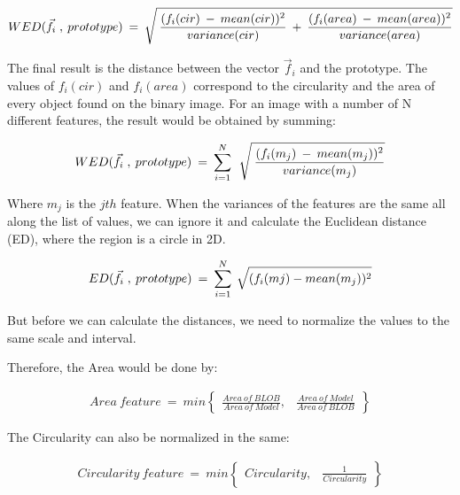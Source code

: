 \begin{equation}	
	\begin{aligned}
{WED(\vec{f}_{i} \; , \: prototype)} \: = \: \sqrt{\mathstrut \:  \displaystyle\frac{(f_{i}(cir) \: - \: mean(cir))^2}{variance(cir)} \: + \: \displaystyle\frac{(f_{i}(area) \: - \: mean(area))^2}{variance(area)}}
\label{Euclidean}
	\end{aligned}
\end{equation}

The final result is the distance between the vector {$\vec{f}_{i}$} and the prototype. The values of {$f_{i}(cir)$} and {$f_{i}(area)$} correspond to the circularity and the area of every object found on the binary image. For an image with a number of N different features, the result would be obtained by summing:


\begin{equation}	
	\begin{aligned}
{WED(\vec{f}_{i} \; , \: prototype)} \: = \: \displaystyle\sum_{i=1}^N \: \: \sqrt{\mathstrut \:  \displaystyle\frac{(f_{i}(m_{j}) \: - \: mean(m_{j}))^2}{variance(m_{j})}}
\label{Euclidean1}
	\end{aligned}
\end{equation}

Where {$m_{j}$} is the {$jth$} feature. When the variances of the features are the same all along the list of values, we can ignore it and calculate the Euclidean distance (ED), where the region is a circle in 2D.

\begin{equation}	
	\begin{aligned}
{ED(\vec{f}_{i} \; , \: prototype)} \: = \: \displaystyle\sum_{i=1}^N \: \sqrt{\mathstrut (f_{i}(m{j}) - mean(m_{j}))^2}
\label{Euclidean2}
	\end{aligned}
\end{equation}

But before we can calculate the distances, we need to normalize the values to the same scale and interval.

Therefore, the Area would be done by:

\begin{equation}	
	\begin{aligned}
{Area \: feature} \: = \: min \begin{Bmatrix} \displaystyle\frac{Area\:of\:BLOB}{Area\:of\:Model}, & \displaystyle\frac{Area\:of\:Model}{Area\:of\:BLOB}\end{Bmatrix}
\label{NormArea}
	\end{aligned}
\end{equation}

The Circularity can also be normalized in the same:

\begin{equation}	
	\begin{aligned}
{Circularity \: feature} \: = \: min \begin{Bmatrix} {Circularity}, & \displaystyle\frac{1}{Circularity}\end{Bmatrix}
\label{NormCirc}
	\end{aligned}
\end{equation}

